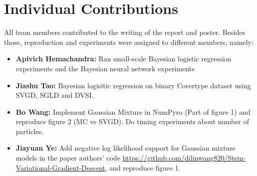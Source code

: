 \section{Individual Contributions}
All team members contributed to the writing of the report and poster. Besides those, reproduction and experiments were assigned to different members, namely:
\begin{itemize}
    \item \textbf{Apivich Hemachandra: } Ran small-scale Bayesian logistic regression experiments and the Bayesian neural network experiments
    \item \textbf{Jiashu Tao:} Bayesian logisitic regression on binary Covertype dataset using SVGD, SGLD and DVSI.
    \item \textbf{Bo Wang:} Implement Gaussian Mixture in NumPyro (Part of figure 1) and reproduce figure 2 (MC vs SVGD). Do timing experiments about number of particles.
    \item \textbf{Jiayuan Ye:} Add negative log likelihood support for Gaussian mixture models in the paper authors' code \url{https://github.com/dilinwang820/Stein-Variational-Gradient-Descent}, and reproduce figure 1. 
\end{itemize}